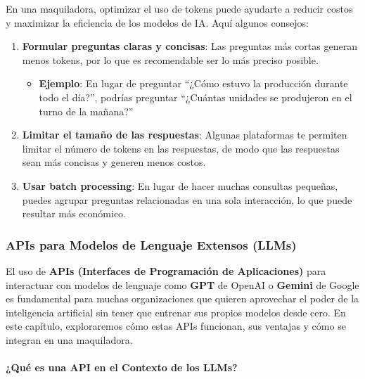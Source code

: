 \documentclass[
  10pt,
  letterpaper,
]{book}
\makeatletter
\let\oldparagraph\paragraph
\renewcommand{\paragraph}{
    \@ifstar
      \xxxParagraphStar
      \xxxParagraphNoStar
  }
\newcommand{\xxxParagraphStar}[1]{\oldparagraph*{#1}\mbox{}}
\newcommand{\xxxParagraphNoStar}[1]{\oldparagraph{#1}\mbox{}}
\providecommand{\tightlist}{%
  \setlength{\itemsep}{0pt}\setlength{\parskip}{0pt}}\usepackage{longtable,booktabs,array}
\makeatother
\begin{document}
En una maquiladora, optimizar el uso de tokens puede ayudarte a reducir
costos y maximizar la eficiencia de los modelos de IA. Aquí algunos
consejos:

\begin{enumerate}
\def\labelenumi{\arabic{enumi}.}
\item
  \textbf{Formular preguntas claras y concisas}: Las preguntas más
  cortas generan menos tokens, por lo que es recomendable ser lo más
  preciso posible.

  \begin{itemize}
  \tightlist
  \item
    \textbf{Ejemplo}: En lugar de preguntar ``¿Cómo estuvo la producción
    durante todo el día?'', podrías preguntar ``¿Cuántas unidades se
    produjeron en el turno de la mañana?''
  \end{itemize}
\item
  \textbf{Limitar el tamaño de las respuestas}: Algunas plataformas te
  permiten limitar el número de tokens en las respuestas, de modo que
  las respuestas sean más concisas y generen menos costos.
\item
  \textbf{Usar batch processing}: En lugar de hacer muchas consultas
  pequeñas, puedes agrupar preguntas relacionadas en una sola
  interacción, lo que puede resultar más económico.
\end{enumerate}

\subsubsection{APIs para Modelos de Lenguaje Extensos
(LLMs)}\label{apis-para-modelos-de-lenguaje-extensos-llms}

El uso de \textbf{APIs (Interfaces de Programación de Aplicaciones)}
para interactuar con modelos de lenguaje como \textbf{GPT} de OpenAI o
\textbf{Gemini} de Google es fundamental para muchas organizaciones que
quieren aprovechar el poder de la inteligencia artificial sin tener que
entrenar sus propios modelos desde cero. En este capítulo, exploraremos
cómo estas APIs funcionan, sus ventajas y cómo se integran en una
maquiladora.

\paragraph{\texorpdfstring{\textbf{¿Qué es una API en el Contexto de los
LLMs?}}{¿Qué es una API en el Contexto de los LLMs?}}\label{quuxe9-es-una-api-en-el-contexto-de-los-llms}
\end{document}

